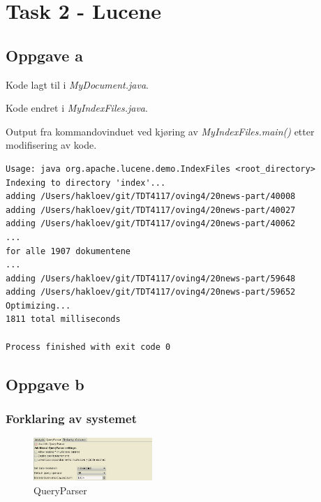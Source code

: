 \lstset{language=Java,
numberstyle=\footnotesize,
basicstyle=\ttfamily\footnotesize,
frame=shadowbox,
breaklines=true}

\section*{Task 2 - Lucene}

\subsection*{Oppgave a}

Kode lagt til i \textit{MyDocument.java}.


\noindent Kode endret i \textit{MyIndexFiles.java}.


\noindent Output fra kommandovinduet ved kjøring av \textit{MyIndexFiles.main()} etter modifisering av kode.
\begin{lstlisting}[frame=single]
Usage: java org.apache.lucene.demo.IndexFiles <root_directory>
Indexing to directory 'index'...
adding /Users/hakloev/git/TDT4117/oving4/20news-part/40008
adding /Users/hakloev/git/TDT4117/oving4/20news-part/40027
adding /Users/hakloev/git/TDT4117/oving4/20news-part/40062
... 
for alle 1907 dokumentene
...
adding /Users/hakloev/git/TDT4117/oving4/20news-part/59648
adding /Users/hakloev/git/TDT4117/oving4/20news-part/59652
Optimizing...
1811 total milliseconds

Process finished with exit code 0
\end{lstlisting}

\newpage
\subsection*{Oppgave b}

\subsubsection*{Forklaring av systemet}

\begin{figure}
\centering
\includegraphics[width=0.4\textwidth]{images/boolean.png}
\caption{QueryParser}
\label{fig:boolean}
\end{figure}


